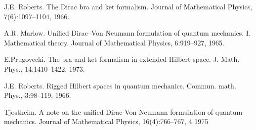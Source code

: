\documentclass[12pt]{article}
\theoremstyle{plain}
\theoremstyle{definition}
\numberwithin{equation}{section}
\begin{document}
J.E. Roberts. The Dirac bra and ket formalism. Journal of Mathematical Physics, 7(6):1097--1104, 1966.

A.R. Marlow. Unified Dirac--Von Neumann formulation of quantum mechanics. I. Mathematical theory. Journal of Mathematical Physics, 6:919--927, 1965.

E.Prugovecki. The bra and ket formalism in extended Hilbert space. J. Math. Phys., 14:1410--1422, 1973.

J.E. Roberts. Rigged Hilbert spaces in quantum mechanics. Commun. math. Phys., 3:98--119, 1966. 

Tjostheim. A note on the unified Dirac-Von Neumann formulation of quantum mechanics. Journal of Mathematical Physics, 16(4):766--767, 4 1975

\end{document}
